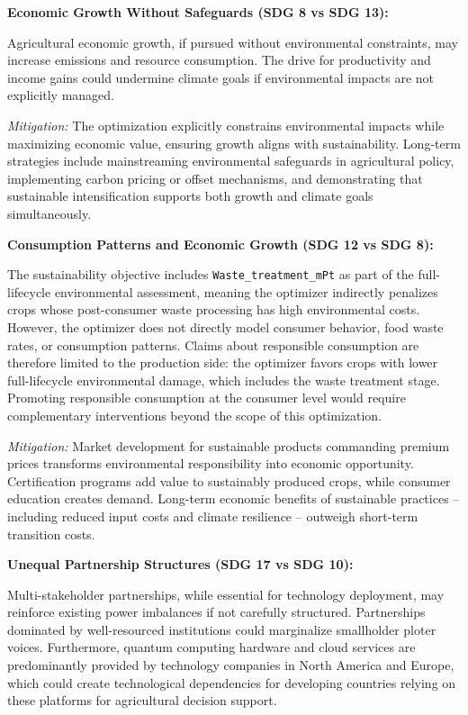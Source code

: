\documentclass{oqireport}
\begin{document}

\textbf{Economic Growth Without Safeguards (SDG 8 vs SDG 13):}

Agricultural economic growth, if pursued without environmental constraints, may increase emissions and resource consumption. The drive for productivity and income gains could undermine climate goals if environmental impacts are not explicitly managed.

\textit{Mitigation:} The optimization explicitly constrains environmental impacts while maximizing economic value, ensuring growth aligns with sustainability. Long-term strategies include mainstreaming environmental safeguards in agricultural policy, implementing carbon pricing or offset mechanisms, and demonstrating that sustainable intensification supports both growth and climate goals simultaneously.

\textbf{Consumption Patterns and Economic Growth (SDG 12 vs SDG 8):}

The sustainability objective includes \texttt{Waste\_treatment\_mPt} as part of the full-lifecycle environmental assessment, meaning the optimizer indirectly penalizes crops whose post-consumer waste processing has high environmental costs. However, the optimizer does not directly model consumer behavior, food waste rates, or consumption patterns. Claims about responsible consumption are therefore limited to the production side: the optimizer favors crops with lower full-lifecycle environmental damage, which includes the waste treatment stage. Promoting responsible consumption at the consumer level would require complementary interventions beyond the scope of this optimization.

\textit{Mitigation:} Market development for sustainable products commanding premium prices transforms environmental responsibility into economic opportunity. Certification programs add value to sustainably produced crops, while consumer education creates demand. Long-term economic benefits of sustainable practices -- including reduced input costs and climate resilience -- outweigh short-term transition costs.

\textbf{Unequal Partnership Structures (SDG 17 vs SDG 10):}

Multi-stakeholder partnerships, while essential for technology deployment, may reinforce existing power imbalances if not carefully structured. Partnerships dominated by well-resourced institutions could marginalize smallholder ploter voices. Furthermore, quantum computing hardware and cloud services are predominantly provided by technology companies in North America and Europe, which could create technological dependencies for developing countries relying on these platforms for agricultural decision support.
\end{document}
